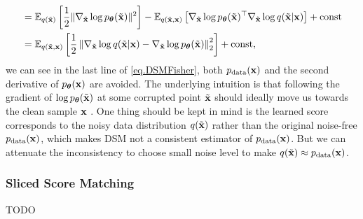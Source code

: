 \documentclass{article}
\begin{document}
\begin{equation}
\begin{aligned}
        &= \mathbb{E}_{q(\tilde{{\mathbf{x}}})}\left[ \frac{1}{2}\| \nabla_{\tilde{{\mathbf{x}}}}\log p_{\bm{\theta}}(\tilde{{\mathbf{x}}}) \|^2\right] - 
        \mathbb{E}_{q(\tilde{{\mathbf{x}}}, {\mathbf{x}})} \left[ \nabla_{\tilde{{\mathbf{x}}}}\log p_{\bm{\theta}}(\tilde{{\mathbf{x}}})^\top\nabla_{\tilde{{\mathbf{x}}}}\log q(\tilde{{\mathbf{x}}}|{\mathbf{x}}) \right] + \text{const}\\
        &= \mathbb{E}_{q(\tilde{{\mathbf{x}}}, {\mathbf{x}})}\left[\frac{1}{2}\left\|\nabla_{\tilde{{{\mathbf{x}}}}} \log q(\tilde{\mathbf{x}} | \mathbf{x})-\nabla_{\tilde{{\mathbf{x}}}} \log p_{\boldsymbol{\theta}}(\tilde{\mathbf{x}})\right\|_2^2\right] + \text{const},
    \end{aligned}
\end{equation}
we can see in the last line of \eqref{eq.DSMFisher}, both $p_{\rm{data}}({\mathbf{x}})$ and the second derivative of $p_{\bm{\theta}}
({\mathbf{x}})$ are avoided. The underlying intuition is that following the gradient of $\log p_{\bm{\theta}}(\tilde{{\mathbf{x}}})$  at some corrupted point $\tilde{{\mathbf{x}}}$ should ideally move us towards the clean sample ${\mathbf{x}}$ \citep{vincent2011connection}. One thing should be kept in mind is the learned score corresponds to the noisy data distribution $q(\tilde{{\mathbf{x}}})$ rather than the original noise-free $p_{\rm{data}}({\mathbf{x}})$, which makes DSM not a consistent estimator of $p_{\rm{data}}({\mathbf{x}})$. But we can attenuate the inconsistency to choose small noise level to make $q(\tilde{{\mathbf{x}}}) \approx p_{\rm{data}}({\mathbf{x}})$.

\subsubsection{Sliced Score Matching}
TODO
\end{document}
